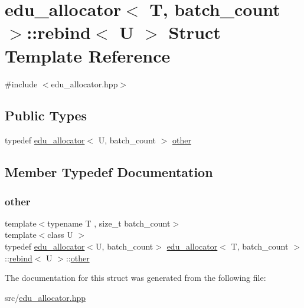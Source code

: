 \hypertarget{structedu__allocator_1_1rebind}{}\section{edu\+\_\+allocator$<$ T, batch\+\_\+count $>$\+:\+:rebind$<$ U $>$ Struct Template Reference}
\label{structedu__allocator_1_1rebind}


{\ttfamily \#include $<$edu\+\_\+allocator.\+hpp$>$}

\subsection*{Public Types}
\begin{DoxyCompactItemize}
\item 
typedef \hyperlink{classedu__allocator}{edu\+\_\+allocator}$<$ U, batch\+\_\+count $>$ \hyperlink{structedu__allocator_1_1rebind_a87ffa9dc069df6bf83bbda72245f4ce2}{other}
\end{DoxyCompactItemize}


\subsection{Member Typedef Documentation}
\mbox{\label{structedu__allocator_1_1rebind_a87ffa9dc069df6bf83bbda72245f4ce2}} 
\subsubsection{\texorpdfstring{other}{other}}
{\footnotesize\ttfamily template$<$typename T , size\+\_\+t batch\+\_\+count$>$ \\
template$<$class U $>$ \\
typedef \hyperlink{classedu__allocator}{edu\+\_\+allocator}$<$U, batch\+\_\+count$>$ \hyperlink{classedu__allocator}{edu\+\_\+allocator}$<$ T, batch\+\_\+count $>$\+::\hyperlink{structedu__allocator_1_1rebind}{rebind}$<$ U $>$\+::\hyperlink{structedu__allocator_1_1rebind_a87ffa9dc069df6bf83bbda72245f4ce2}{other}}



The documentation for this struct was generated from the following file\+:\begin{DoxyCompactItemize}
\item 
src/\hyperlink{edu__allocator_8hpp}{edu\+\_\+allocator.\+hpp}\end{DoxyCompactItemize}
